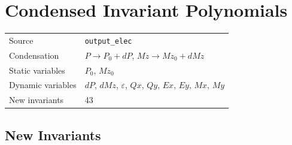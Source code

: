 \documentclass{article}
\begin{document}
\section*{Condensed Invariant Polynomials}

\begin{tabular}{ll}
\toprule
Source & \texttt{output_elec} \\
Condensation & $P \to P_{0} + dP$, $Mz \to Mz_{0} + dMz$ \\
Static variables & $P_{0}$, $Mz_{0}$ \\
Dynamic variables & $dP$, $dMz$, $ε$, $Qx$, $Qy$, $Ex$, $Ey$, $Mx$, $My$ \\
New invariants & 43 \\
\bottomrule
\end{tabular}

\subsection*{New Invariants}
\end{document}
